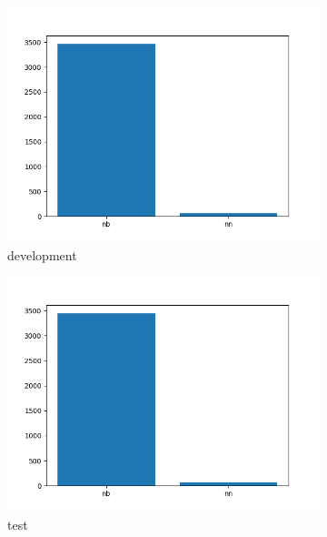 \documentclass{report}
\begin{document}
\begin{figure}[h!]
	\begin{subfigure}{.33\textwidth}
		\centering
		\includegraphics[width=1\linewidth]{img/dev_lngs}
		\caption{development}
		\label{fig:devlngs}
	\end{subfigure}%
	\begin{subfigure}{.33\textwidth}	
		\centering
		\includegraphics[width=1\linewidth]{img/test_lngs}
		\caption{test}
		\label{fig:testlngs}
	\end{subfigure}%
	\begin{subfigure}{.33\textwidth}
		\centering

\end{subfigure}
\end{figure}
\end{document}
